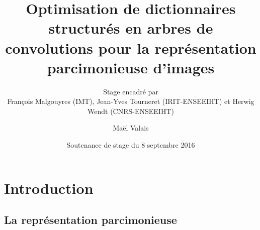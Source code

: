 


\title{Optimisation de dictionnaires structurés en arbres de convolutions pour la représentation parcimonieuse d'images}
\subtitle{Stage encadré par\\François Malgouyres (IMT), Jean-Yves Tourneret (IRIT-ENSEEIHT) et Herwig Wendt (CNRS-ENSEEIHT)}



\date{Soutenance de stage du 8 septembre 2016}
\author{Maël Valais}



\maketitle


\section{Introduction}
\subsection{La représentation parcimonieuse}


